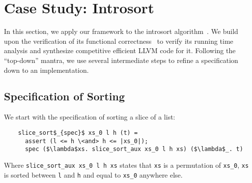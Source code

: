 \documentclass[acmsmall]{acmart}
\newcommand{\is}{\lstinline[language=isabelle]}
\begin{document}
\begin{comment}
where does the imperative data structure come into the picture?
Where is the most (creative) work to be done?
Where can I see that there is a separation of concerns?
Where is Data and Currency refinement?

\end{comment}
 


\section{Case Study: Introsort} \label{sec:introsort}


In this section, we apply our framework to the introsort algorithm~\cite{Musser97}.
We build upon the verification of its functional correctness~\cite{Lammich20} 
to verify its running time analysis and synthesize competitive efficient LLVM code for it.
Following the ``top-down'' mantra, we use several intermediate steps to
refine a specification down to an implementation.


\subsection{Specification of Sorting}
We start with the specification of sorting a slice of a list:
\begin{lstlisting}
    slice_sort$_{spec}$ xs_0 l h (t) =
      assert (l <= h \<and> h <= |xs_0|);
      spec ($\lambda$xs. slice_sort_aux xs_0 l h xs) ($\lambda$_. t)
\end{lstlisting}
Where \is{slice_sort_aux xs_0 l h xs} states that \is{xs} is a permutation of \is{xs_0}, \is{xs} is sorted between \is{l} and \is{h} and equal to \is{xs_0} anywhere else.
\end{document}

